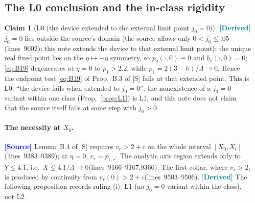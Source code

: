 \documentclass[11pt,a4paper]{article}
\theoremstyle{definition}
\newtheorem{claim}[theorem]{Claim}
\theoremstyle{remark}
\newcommand{\lnos}[1]{(lines~#1)}
\newcommand{\ORIG}{\textcolor{blue}{\textbf{[Source]}}}
\newcommand{\DER}{\textcolor{teal}{\textbf{[Derived]}}}
\begin{document}
\subsection{The L0 conclusion and the in-class rigidity}
\label{sec:note3-L0}

\begin{claim}[L0 (the device extended to the external limit point $j_0=0$)]
\label{cl:L0}
\DER
$j_0=0$ lies outside the source's domain (the source allows only $0<j_0\le.05$\lnos{9002}; this note
extends the device to that external limit point): the unique real fixed point lies on the
$\eta\mapsto-\eta$ symmetry, so $p_2(\cdot,0)\equiv 0$ and $b_s(\cdot,0)=0$;
\eqref{eq:B19} degenerates at $\eta=0$ to $p_1>2.2$, while $p_1=2(3-h)/\Lambda\to 0$.
Hence the endpoint test \eqref{eq:B19} of Prop.~B.3 of [S] fails at that extended point.
This is L0: ``the device fails when extended to $j_0=0$'';
the nonexistence of a $j_0=0$ variant within one class (Prop.~\ref{prop:L1}) is L1,
and this note does not claim that the source itself fails at some step with $j_0>0$.
\end{claim}

\paragraph{The necessity at $X_0$.}
\ORIG
Lemma~B.4 of [S] requires $v_r>2+c$ on the whole interval $[X_0,X_i]$\lnos{9383--9389};
at $\eta=0$, $v_r=p_{1,r}$.
The analytic axis region extends only to $Y\le 4.1$, i.e.\ $X\le 4.1/\Lambda\to 0$\lnos{9166--9167,9366}.
The first collar, where $v_s>2$, is produced by continuity from $v_r(0)>2+c$\lnos{9503--9506}.
\DER
The following proposition records ruling (i): L1 (no $j_0=0$ variant within the class), not L2.
\end{document}

